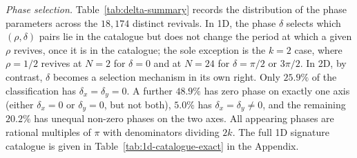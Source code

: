 \emph{Phase selection.}
Table~\ref{tab:delta-summary} records the distribution of the
phase parameters across the $18{,}174$ distinct revivals. In 1D,
the phase $\delta$ selects which $(\rho, \delta)$ pairs lie in the
catalogue but does not change the period at which a given $\rho$
revives, once it is in the catalogue; the sole exception is the
$k = 2$ case, where $\rho = 1/2$ revives at $N = 2$ for
$\delta = 0$ and at $N = 24$ for $\delta = \pi/2$ or $3\pi/2$. In
2D, by contrast, $\delta$ becomes a selection mechanism in its own
right. Only $25.9\%$ of the classification has
$\delta_x = \delta_y = 0$. A further $48.9\%$ has zero phase on
exactly one axis (either $\delta_x = 0$ or $\delta_y = 0$, but not
both), $5.0\%$ has $\delta_x = \delta_y \neq 0$, and the remaining
$20.2\%$ has unequal non-zero phases on the two axes. All appearing
phases are rational multiples of $\pi$ with denominators dividing
$2k$. The full 1D signature catalogue is given in
Table~\ref{tab:1d-catalogue-exact} in the Appendix.


